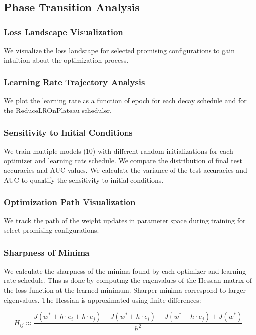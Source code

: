 \documentclass[conference]{IEEEtran}
\begin{document}
\subsection{Phase Transition Analysis}

\subsubsection{Loss Landscape Visualization}
We visualize the loss landscape for selected promising configurations to gain intuition about the optimization process.

\subsubsection{Learning Rate Trajectory Analysis}
We plot the learning rate as a function of epoch for each decay schedule and for the ReduceLROnPlateau scheduler.

\subsubsection{Sensitivity to Initial Conditions}
We train multiple models (10) with different random initializations for each optimizer and learning rate schedule. We compare the distribution of final test accuracies and AUC values. We calculate the variance of the test accuracies and AUC to quantify the sensitivity to initial conditions.

\subsubsection{Optimization Path Visualization}
We track the path of the weight updates in parameter space during training for select promising configurations.

\subsubsection{Sharpness of Minima}
We calculate the sharpness of the minima found by each optimizer and learning rate schedule. This is done by computing the eigenvalues of the Hessian matrix of the loss function at the learned minimum. Sharper minima correspond to larger eigenvalues. The Hessian is approximated using finite differences:

\begin{equation}
H_{ij} \approx \frac{J(w^* + h \cdot e_i + h \cdot e_j) - J(w^* + h \cdot e_i) - J(w^* + h \cdot e_j) + J(w^*)}{h^2}
\end{equation}
\end{document}
